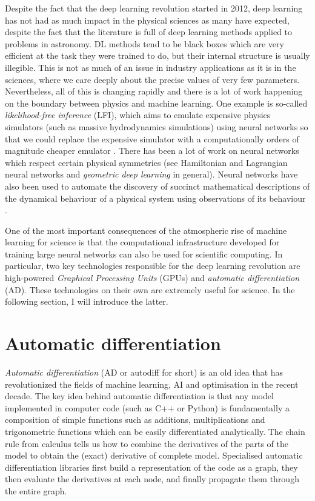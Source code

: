 \documentclass[12pt,dvipsnames]{report}
\newcommand{\ssf}[1]{\textsf{#1}}
\begin{document}
Despite the fact that the deep learning revolution started in 2012, 
deep learning has not had as much impact  in the physical sciences as many have 
expected, despite the fact that the literature is full of deep learning methods 
applied to problems in astronomy.
DL methods tend to be black boxes which are very efficient at 
the task they were trained to do, but their internal structure is usually 
illegible. This is not as much of an issue in industry applications as it is 
in the sciences, where we care deeply about the precise values of very few 
parameters.
Nevertheless, all of this is changing rapidly and there is  a lot of work 
happening on the boundary between physics and machine learning. One example is 
so-called \emph{likelihood-free inference} (LFI), which aims to emulate expensive 
physics simulators (such as massive hydrodynamics simulations) using neural 
networks so that we could replace the expensive simulator with a computationally 
orders of magnitude cheaper 
emulator \citep[see for example the review paper by]{2020PNAS..11730055C}. 
There has been a lot of work on neural networks which respect certain physical 
symmetries (see Hamiltonian and Lagrangian neural networks and 
\emph{geometric deep learning} in general).
Neural networks have also been used to automate the discovery of succinct mathematical 
descriptions of the dynamical behaviour of a physical system using observations of its 
behaviour \citep{arXiv:2006.11287}.

One of the most important consequences of the atmospheric rise of machine 
learning for science is that the computational infrastructure developed for training 
large neural networks can also be used for scientific computing. In particular,
two key technologies responsible for the deep learning revolution
are high-powered \emph{Graphical Processing Units} (GPUs) and 
\emph{automatic differentiation} (AD). These technologies on their own are extremely 
useful for science. In the following section, I will introduce the latter.

\section{Automatic differentiation}
\label{sec:autodiff}
\emph{Automatic differentiation} (AD or autodiff for short)\citep{10.1145/355586.364791} is an old idea 
that has revolutionized the fields of machine learning, AI and optimisation in the 
recent decade. 
The key idea behind automatic differentiation 
is that any model implemented in computer code (such as \ssf{C++} or 
\ssf{Python}) is fundamentally a composition 
of simple functions such as additions, multiplications and trigonometric functions 
which can be easily differentiated analytically.
The chain rule from calculus tells us how to combine the derivatives of the parts of 
the model to obtain the (exact) derivative of complete model.
Specialised automatic differentiation libraries first build a representation of the 
code as a graph, they then evaluate the derivatives at each node, and finally propagate them 
through the entire graph. 
\end{document}
